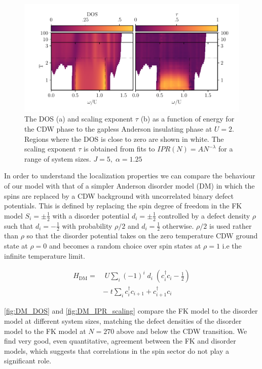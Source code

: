 \hypertarget{fig:gap_opening_U2}{%
\begin{figure}
\centering
\includegraphics[width=1\textwidth,height=\textheight]{figure_code/fk_chapter/gap_opening/gap_opening_U2}
\caption[{The transition from CDW to the Anderson Phase}]{The DOS (a) and scaling exponent \(\tau\) (b) as a function of energy for the CDW phase to the gapless Anderson insulating phase at \(U=2\). Regions where the DOS is close to zero are shown in white. The scaling exponent \(\tau\) is obtained from fits to \(IPR(N) = A N^{-\lambda}\) for a range of system sizes. \(J = 5,\;\alpha = 1.25\)}
\label{fig:gap_opening_U2}
\end{figure}
}

In order to understand the localization properties we can compare the behaviour of our model with that of a simpler Anderson disorder model (DM) in which the spins are replaced by a CDW background with uncorrelated binary defect potentials. This is defined by replacing the spin degree of freedom in the FK model \(S_i = \pm \tfrac{1}{2}\) with a disorder potential \(d_i = \pm \tfrac{1}{2}\) controlled by a defect density \(\rho\) such that \(d_i = -\tfrac{1}{2}\) with probability \(\rho/2\) and \(d_i = \tfrac{1}{2}\) otherwise. \(\rho/2\) is used rather than \(\rho\) so that the disorder potential takes on the zero temperature CDW ground state at \(\rho = 0\) and becomes a random choice over spin states at \(\rho = 1\) i.e the infinite temperature limit.

\[\begin{aligned}
H_{\mathrm{DM}} = & \;U \sum_{i} (-1)^i \; d_i \;(c^\dagger_{i}c_{i} - \tfrac{1}{2}) \\
& -\;t \sum_{i} c^\dagger_{i}c_{i+1} + c^\dagger_{i+1}c_{i}
\end{aligned}\]

\cref{fig:DM_DOS} and \cref{fig:DM_IPR_scaling} compare the FK model to the disorder model at different system sizes, matching the defect densities of the disorder model to the FK model at \(N = 270\) above and below the CDW transition. We find very good, even quantitative, agreement between the FK and disorder models, which suggests that correlations in the spin sector do not play a significant role.

